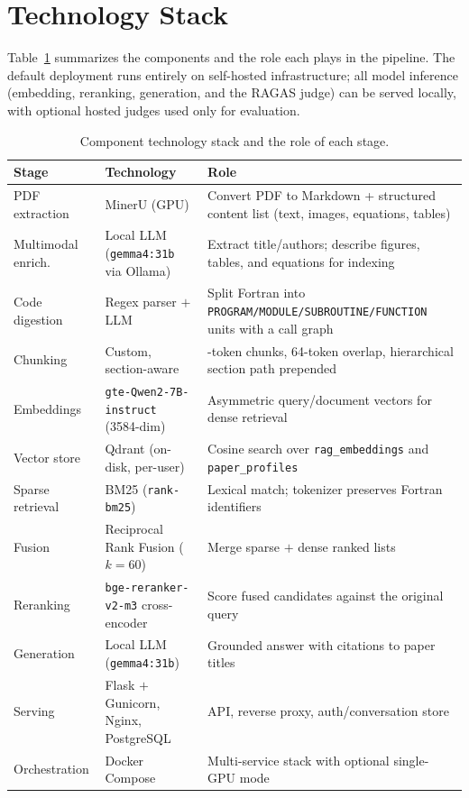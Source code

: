 \documentclass[11pt,a4paper]{article}
\newcommand{\code}[1]{\texttt{\small #1}}
\begin{document}
\section{Technology Stack}
Table~\ref{tab:stack} summarizes the components and the role each plays in the
pipeline. The default deployment runs entirely on self-hosted infrastructure;
all model inference (embedding, reranking, generation, and the RAGAS judge) can
be served locally, with optional hosted judges used only for evaluation.

\begin{table}[H]
\centering
\small
\renewcommand{\arraystretch}{1.25}
\begin{tabular}{>{\raggedright\arraybackslash}p{3.1cm}
                >{\raggedright\arraybackslash}p{5.1cm}
                >{\raggedright\arraybackslash}p{5.6cm}}
\toprule
\textbf{Stage} & \textbf{Technology} & \textbf{Role} \\
\midrule
PDF extraction      & MinerU (GPU)                          & Convert PDF to Markdown + structured content list (text, images, equations, tables) \\
Multimodal enrich.  & Local LLM (\code{gemma4:31b} via Ollama) & Extract title/authors; describe figures, tables, and equations for indexing \\
Code digestion      & Regex parser $+$ LLM                  & Split Fortran into \code{PROGRAM/MODULE/SUBROUTINE/FUNCTION} units with a call graph \\
Chunking            & Custom, section-aware                 & 384-token chunks, 64-token overlap, hierarchical section path prepended \\
Embeddings          & \code{gte-Qwen2-7B-instruct} (3584-dim) & Asymmetric query/document vectors for dense retrieval \\
Vector store        & Qdrant (on-disk, per-user)            & Cosine search over \code{rag\_embeddings} and \code{paper\_profiles} \\
Sparse retrieval    & BM25 (\code{rank-bm25})               & Lexical match; tokenizer preserves Fortran identifiers \\
Fusion              & Reciprocal Rank Fusion ($k{=}60$)     & Merge sparse $+$ dense ranked lists \\
Reranking           & \code{bge-reranker-v2-m3} cross-encoder & Score fused candidates against the original query \\
Generation          & Local LLM (\code{gemma4:31b})         & Grounded answer with citations to paper titles \\
Serving             & Flask $+$ Gunicorn, Nginx, PostgreSQL & API, reverse proxy, auth/conversation store \\
Orchestration       & Docker Compose                        & Multi-service stack with optional single-GPU mode \\
\bottomrule
\end{tabular}
\caption{Component technology stack and the role of each stage.}
\label{tab:stack}
\end{table}
\end{document}
